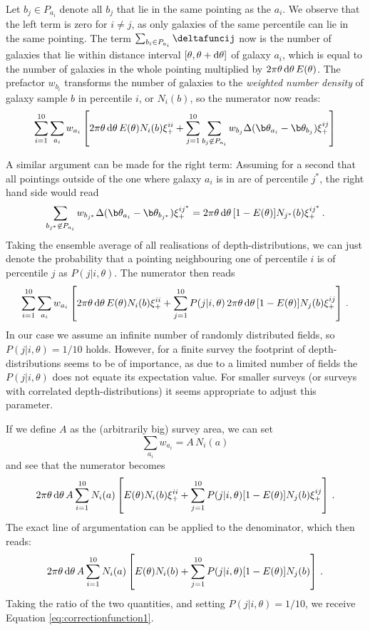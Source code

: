 Let $b_j\in P_{a_i}$ denote all $b_j$ that lie in the same pointing as the $a_i$. We observe that the left term is zero for $i\neq j$, as only galaxies of the same percentile can lie in the same pointing. The term $\sum_{b_i\in P_{a_i}}\deltafuncij$ now is the number of galaxies that lie within distance interval $[\theta,\theta+{\rm d}\theta]$ of galaxy $a_i$, which is equal to the number of galaxies in the whole pointing multiplied by $2\pi\theta\, {\rm d}\theta\, E(\theta)$. The prefactor $w_{b_i}$ transforms the number of galaxies to the \emph{weighted number density} of galaxy sample $b$ in percentile $i$, or $N_i(b)$, so the numerator now reads:
\begin{align*}
\sum_{i=1}^{10}\sum_{a_i}w_{a_i} \left[ 2\pi\theta\, {\rm d}\theta\, E(\theta) N_i(b)\xi_+^{ii} + \sum_{j=1}^{10}\sum_{b_j\not\in P_{a_i}} w_{b_j} \Delta(\b\theta_{a_i}-\b\theta_{b_j})\xi_+^{ij} \right]
\end{align*}

 A similar argument can be made for the right term: Assuming for a second that all pointings outside of the one where galaxy $a_i$ is in are of percentile $j^*$, the right hand side would read \[
\sum_{b_{j^*}\not\in P_{a_i}} w_{b_{j^*}} \Delta(\b\theta_{a_i}-\b\theta_{b_{j^*}})\xi_+^{i{j^*}} = 2\pi\theta\, {\rm d}\theta\, [1-E(\theta)]N_{j^*}(b)\xi_+^{i{j^*}}\, .
 \]  
 Taking the ensemble average of all realisations of depth-distributions, we can just denote the probability that a pointing neighbouring one of percentile $i$ is of percentile $j$ as $P(j | i,\theta)$. The numerator then reads \[
 \sum_{i=1}^{10}\sum_{a_i}w_{a_i} \left[ 2\pi\theta\, {\rm d}\theta\, E(\theta) N_i(b)\xi_+^{ii} + \sum_{j=1}^{10} P(j|i,\theta)\, 2\pi\theta\, {\rm d}\theta\, [1-E(\theta)]N_{j}(b)\xi_+^{i{j}} \right]\, .
 \]
 In our case we assume an infinite number of randomly distributed fields, so $P(j | i,\theta)=1/10$ holds. However, for a finite survey the footprint of depth-distributions seems to be of importance, as due to a limited number of fields the $P(j | i,\theta)$ does not equate its expectation value. For smaller surveys (or surveys with correlated depth-distributions) it seems appropriate to adjust this parameter. 
 
 If we define $A$ as the (arbitrarily big) survey area, we can set \[
 \sum_{a_i} w_{a_i} = A\, N_i(a)
 \]
 and see that the numerator becomes \[
 2\pi\theta\, {\rm d}\theta\, A \sum_{i=1}^{10}N_i(a) \left[E(\theta) N_i(b)\xi_+^{ii} + \sum_{j=1}^{10} P(j|i,\theta) [1-E(\theta)]N_{j}(b)\xi_+^{i{j}} \right]\, .
 \]
 The exact line of argumentation can be applied to the denominator, which then reads: \[
  2\pi\theta\, {\rm d}\theta\, A \sum_{i=1}^{10}N_i(a) \left[E(\theta) N_i(b) + \sum_{j=1}^{10} P(j|i,\theta) [1-E(\theta)]N_{j}(b) \right]\, .
 \]
Taking the ratio of the two quantities, and setting $P(j | i,\theta)=1/10$, we receive Equation \eqref{eq:correctionfunction1}.

